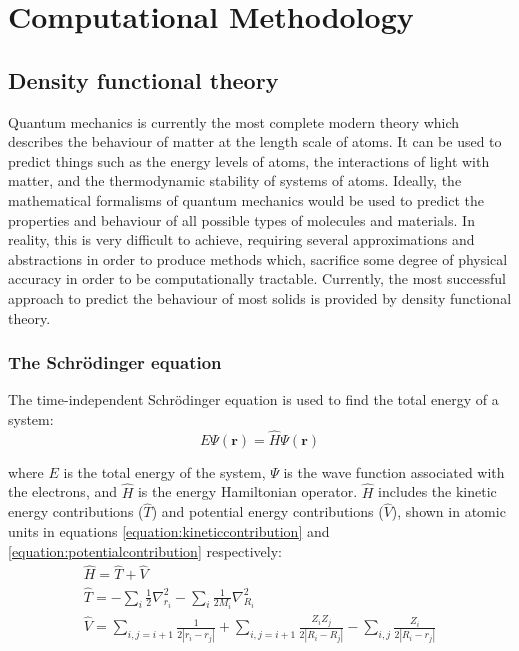 \chapter{Computational Methodology}

\label{ch:compmethodology}

\section{Density functional theory} \label{section:dft}

Quantum mechanics is currently the most complete modern theory which describes the behaviour of matter at the length scale of atoms. It can be used to predict things such as the energy levels of atoms, the interactions of light with matter, and the thermodynamic stability of systems of atoms. Ideally, the mathematical formalisms of quantum mechanics would be used to predict the properties and behaviour of all possible types of molecules and materials. In reality, this is very difficult to achieve, requiring several approximations and abstractions in order to produce methods which, sacrifice some degree of physical accuracy in order to be computationally tractable. Currently, the most successful approach to predict the behaviour of most solids is provided by density functional theory.

\subsection{The Schr\"{o}dinger equation}

The time-independent Schr\"{o}dinger equation is used to find the total energy of a system:
\begin{equation}
E\Psi(\textbf{r}) = \hat{H}\Psi(\textbf{r})
\label{equation:schrodinger}
\end{equation}

where $E$ is the total energy of the system, $\Psi$ is the wave function associated with the electrons, and $\hat{H}$ is the energy Hamiltonian operator. $\hat{H}$ includes the kinetic energy contributions ($\hat{T}$) and potential energy contributions ($\hat{V}$), shown in atomic units in equations \ref{equation:kineticcontribution} and \ref{equation:potentialcontribution} respectively:
\begin{gather}
\hat{H} = \hat{T} + \hat{V} \label{equation:hamiltonian}\\
\hat{T} = -\sum_i{\frac{1}{2}}\nabla^2_{r_i} - \sum_i{\frac{1}{2M_i}}\nabla^2_{R_i} \label{equation:kineticcontribution} \\
\hat{V} = \sum_{i,j=i+1}{\frac{1}{2|r_i - r_j|}} + \sum_{i,j=i+1}{\frac{Z_i Z_j}{2|R_i - R_j|}} - \sum_{i,j}{\frac{Z_i}{2|R_i - r_j|}} \label{equation:potentialcontribution}
\end{gather}

